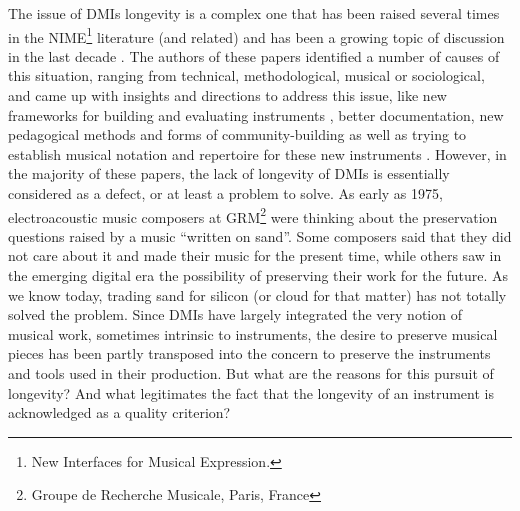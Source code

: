 The issue of DMIs longevity is a complex one that has been raised several times in the NIME\footnote{New Interfaces for Musical Expression.} literature (and related) and has been a growing topic of discussion in the last decade \cite{3}\cite{morreale_design_2017}. The authors of these papers identified a number of causes of this situation, ranging from technical, methodological, musical or sociological, and came up with insights and directions to address this issue, like new frameworks for building and evaluating instruments  \cite{Jorda:2004} \cite{morreale_design_2017}, better documentation, new pedagogical methods and forms of community-building as well as trying to establish musical notation and repertoire for these new instruments \cite{mamedes_composing_2014}\cite{mays_notation_2014}. However, in the majority of these papers, the lack of longevity of DMIs is essentially considered as a defect, or at least a problem to solve.
	As early as 1975, electroacoustic music composers at GRM\footnote{Groupe de Recherche Musicale, Paris, France} were thinking about the preservation questions raised by a music “written on sand”. Some composers said that they did not care about it and made their music for the present time, while others saw in the emerging digital era the possibility of preserving their work for the future. As we know today, trading sand for silicon (or cloud for that matter) has not totally solved the problem. 
	Since DMIs have largely integrated the very notion of musical work, sometimes intrinsic to instruments, the desire to preserve musical pieces has been partly transposed into the concern to preserve the instruments and tools used in their production. But what are the reasons for this pursuit of longevity? And what legitimates the fact that the longevity of an instrument is acknowledged as a quality criterion? 

